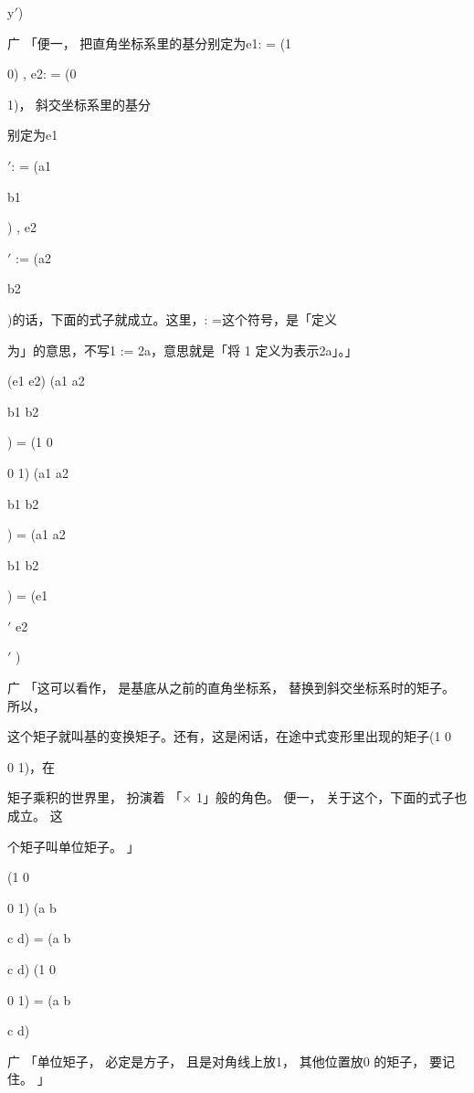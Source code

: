y$\prime$)\par
广 「便一， 把直角坐标系里的基分别定为e1: = (1\par
0) , e2: = (0\par
1)， 斜交坐标系里的基分\par
别定为e1\par
$\prime$: = (a1\par
b1\par
) , e2\par
$\prime$ := (a2\par
b2\par
)的话，下面的式子就成立。这里，: =这个符号，是「定义\par
为」的意思，不写1 := 2a，意思就是「将 1 定义为表示2a」。」\par
(e1 e2) (a1 a2\par
b1 b2\par
) = (1 0\par
0 1) (a1 a2\par
b1 b2\par
) = (a1 a2\par
b1 b2\par
) = (e1\par
$\prime$ e2\par
$\prime$ )\par
广 「这可以看作， 是基底从之前的直角坐标系， 替换到斜交坐标系时的矩子。 所以，\par
这个矩子就叫基的变换矩子。还有，这是闲话，在途中式变形里出现的矩子(1 0\par
0 1)，在\par
矩子乘积的世界里， 扮演着 「$\times$ 1」般的角色。 便一， 关于这个，下面的式子也成立。 这\par
个矩子叫单位矩子。 」\par
(1 0\par
0 1) (a b\par
c d) = (a b\par
c d) (1 0\par
0 1) = (a b\par
c d)\par
广 「单位矩子， 必定是方子， 且是对角线上放1， 其他位置放0 的矩子， 要记住。 」\par

